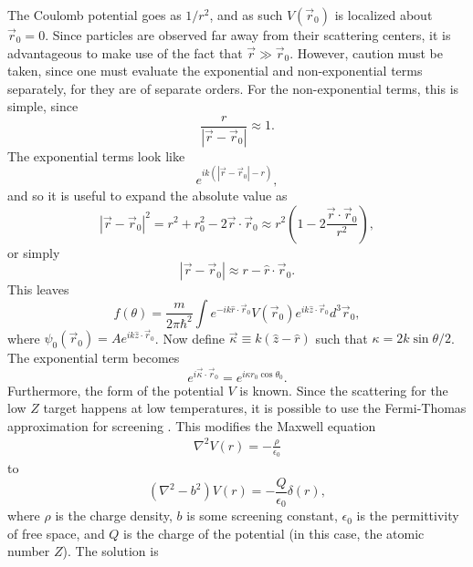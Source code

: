 The Coulomb potential goes as $1/r^2$, and as such $V(\vec{r}_0)$ is localized about $\vec{r}_0=0$. Since particles are observed far away from their scattering centers, it is advantageous to make use of the fact that $\vec{r} \gg \vec{r}_0$. However, caution must be taken, since one must evaluate the exponential and non-exponential terms separately, for they are of separate orders. For the non-exponential terms, this is simple, since
%
\begin{equation}\nonumber
\frac{r}{|\vec{r}-\vec{r}_0|}\approx1.
\end{equation}
%
The exponential terms look like
%
\begin{equation}\nonumber
e^{ik(|\vec{r}-\vec{r}_0|-r)},
\end{equation}
and so it is useful to expand the absolute value as
\begin{equation}\nonumber
|\vec{r}-\vec{r}_0|^2=r^2+r_0^2-2\vec{r}\cdot\vec{r}_0\approx r^2(1-2\frac{\vec{r}\cdot\vec{r}_0}{r^2}),
\end{equation}
%
or simply
%
\begin{equation} \nonumber |\vec{r}-\vec{r}_0|\approx r-\hat{r}\cdot\vec{r}_0. \end{equation}
%
This leaves
%
\begin{equation} \label{eqn:generalscattering}
f(\theta)=\frac{m}{2\pi\hbar^2}\int
e^{-ik\hat{r}\cdot\vec{r}_0}
V(\vec{r}_0)
e^{ik\hat{z}\cdot\vec{r}_0}
d^3\vec{r}_0,
\end{equation}
%
where $\psi_0(\vec{r}_0)=Ae^{ik\hat{z}\cdot\vec{r}_0}$.
Now define $\vec{\kappa}\equiv k(\hat{z}-\hat{r})$ such that $\kappa=2k\sin{\theta/2}$. The exponential term becomes
%
\begin{equation} \nonumber
e^{i\vec{\kappa}\cdot\vec{r}_0}=e^{i\kappa r_0\cos{\theta_0}}.
\end{equation}
Furthermore, the form of the potential $V$ is known. Since the scattering for the low $Z$ target happens at low temperatures, it is possible to use the Fermi-Thomas approximation for screening \cite{ashcroft}. This modifies the Maxwell equation 
\begin{align*}
\nabla^2 V(r) = -\frac{\rho}{\epsilon_0}
\end{align*}
to
\begin{equation} \nonumber
(\nabla^2-b^2)V(r)=-\frac{Q}{\epsilon_0}\delta(r),
\end{equation}
%
where $\rho$ is the charge density, $b$ is some screening constant, $\epsilon_0$ is the permittivity of free space, and $Q$ is the charge of the potential (in this case, the atomic number $Z$). The solution is
